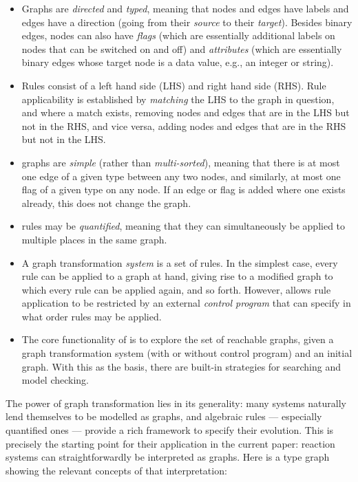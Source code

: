 \documentclass[sn-mathphys-num,a4paper,iicol,lineno,pdflatex]{sn-jnl-hacked}
\theoremstyle{thmstyleone}%
\theoremstyle{thmstyletwo}%
\theoremstyle{thmstylethree}%
\begin{document}
\begin{itemize}
\item Graphs are \emph{directed} and \emph{typed}, meaning that nodes and edges have labels and edges have a direction (going from their \emph{source} to their \emph{target}). Besides binary edges, nodes can also have \emph{flags} (which are essentially additional labels on nodes that can be switched on and off) and \emph{attributes} (which are essentially binary edges whose target node is a data value, e.g., an integer or string).

\item Rules consist of a left hand side (LHS) and right hand side (RHS). Rule applicability is established by \emph{matching} the LHS to the graph in question, and where a match exists, removing nodes and edges that are in the LHS but not in the RHS, and vice versa, adding nodes and edges that are in the RHS but not in the LHS.

\item \GROOVE graphs are \emph{simple} (rather than \emph{multi-sorted}), meaning that there is at most one edge of a given type between any two nodes, and similarly, at most one flag of a given type on any node. If an edge or flag is added where one exists already, this does not change the graph.

\item \GROOVE rules may be \emph{quantified}, meaning that they can simultaneously be applied to multiple places in the same graph.

\item A graph transformation \emph{system} is a set of rules. In the simplest case, every rule can be applied to a graph at hand, giving rise to a modified graph to which every rule can be applied again, and so forth. However, \GROOVE allows rule application to be restricted by an external \emph{control program} that can specify in what order rules may be applied.

\item The core functionality of \GROOVE is to explore the set of reachable graphs, given a graph transformation system (with or without control program) and an initial graph. With this as the basis, there are built-in strategies for searching and model checking.
\end{itemize}
%
The power of graph transformation lies in its generality: many systems naturally lend themselves to be modelled as graphs, and algebraic rules --- especially quantified ones --- provide a rich framework to specify their evolution. This is precisely the starting point for their application in the current paper: reaction systems can straightforwardly be interpreted as graphs. Here is a type graph showing the relevant concepts of that interpretation:
\end{document}
